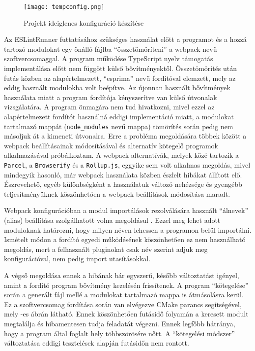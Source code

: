 \begin{figure}[!htbp]
    \caption{Projekt ideiglenes konfiguráció készítése}\label{fig:projtempconfig}
    \centering
    \texttt{[image: tempconfig.png]}
\end{figure}

Az ESLintRunner futtatásához szükséges használat előtt a programot és a hozzá tartozó modulokat egy önálló fájlba ``összetömöríteni'' a webpack nevű szoftvercsomaggal. A program működése TypeScript nyelv támogatás implementálása előtt nem függött külső bővítményektől. Összetömörítés után futás közben az alapértelmezett, ``esprima'' nevű fordítóval elemzett, mely az eddig használt modulokba volt beépítve. Az újonnan használt bővítmények használata miatt a program fordítója kényszerítve van külső útvonalak vizsgálatára. A program önmagára nem tud hivatkozni, mivel ezzel az alapértelmezett fordítót használná eddigi implementáció miatt, a modulokat tartalmazó mappát (\texttt{node\_modules} nevű mappa) tömörítés során pedig nem másoljuk át a kimeneti útvonalra. Erre a probléma megoldására többek között a webpack beállításainak módosításával és alternatív kötegelő programok alkalmazásával próbálkoztam. A webpack alternatívák, melyek közé tartozik a \texttt{Parcel}, a \texttt{Browserify} és a \texttt{Rollup.js}, eggyike sem volt alkalmas megoldás, mivel mindegyik hasonló, már webpack használata közben észlelt hibákat állított elő. Észrevehető, egyéb különbségként a használatuk változó nehézsége és gyengébb teljesítményüknek köszönhetően a webpack beállítások módosítása maradt.

Webpack konfigurációban a modul importálások rezolválására használt ``álnevek'' (alias) beállítása szolgálhatott volna megoldásul \cite{webpack-resolve}. Ezzel meg lehet adott moduloknak határozni, hogy milyen néven lehessen a programon belül importálni. Ismételt módon a fordító egyedi működésének köszönhetően ez nem használható megoldás, mert a felhasznált pluginokat csak név szerint adjuk meg konfigurációval, nem pedig import utasításokkal.

A végső megoldása ennek a hibának bár egyszerű, később változtatást igényel, amint a fordító program bővítmény kezelésén frissítenek. A program ``kötegelése'' során a generált fájl mellé a modulokat tartalmazó mappa is átmásolásra kerül. Ez a szoftvercsomag fordítása során van elvégezve CMake parancs segítségével, mely -es ábrán látható. Ennek köszönhetően futásidő folyamán a keresett modult megtalálja és hibamentesen tudja feladatát végezni. Ennek legfőbb hátránya, hogy a program által foglalt hely többszörösére nőtt. A ``kötegelési módszer'' változtatása eddigi tesztelések alapján futásidőn nem rontott.

